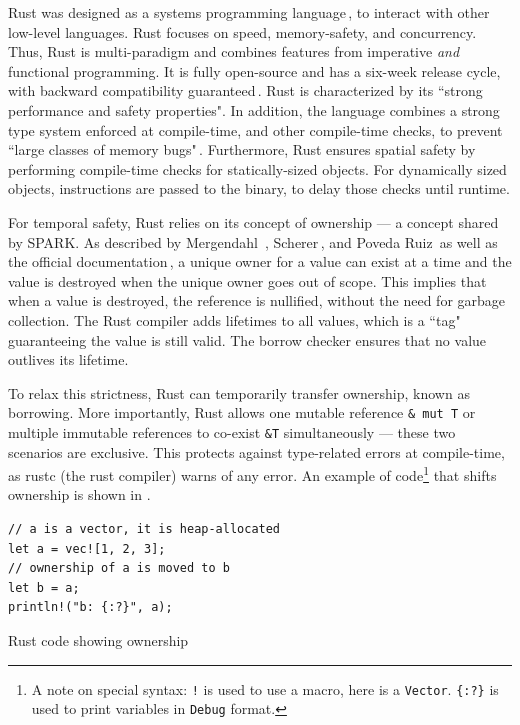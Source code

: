 \documentclass[nomenclature, english, bibtex]{kththesis}
\newcommand{\inlinecode}[1]{\texttt{#1}}
\begin{document}
Rust was designed as a systems programming language\,\cite{mergendahl_cross-language_2022}, to interact with other low-level languages. Rust focuses on speed, \gls{memory-safety}, and concurrency. Thus, Rust is multi-paradigm and combines features from imperative \textit{and} functional programming. It is fully open-source and has a six-week release cycle, with backward compatibility guaranteed\,\cite{poveda_ruiz_bounded_2019,noauthor_rust_nodate}. Rust is characterized by its ``strong performance and safety properties". In addition, the language combines a strong type system enforced at compile-time, and other compile-time checks, to prevent ``large classes of memory bugs"\,\cite{mergendahl_cross-language_2022}. Furthermore, Rust ensures spatial safety by performing compile-time checks for statically-sized objects. For dynamically sized objects, instructions are passed to the binary, to delay those checks until runtime.

For temporal safety, Rust relies on its concept of ownership --- a concept shared by SPARK. As described by Mergendahl \etal\,\cite{mergendahl_cross-language_2022}, Scherer\,\cite{scherer_engineering_2021}, and Poveda Ruiz\,\cite{poveda_ruiz_bounded_2019} as well as the official documentation\,\cite{noauthor_rust_nodate}, a unique owner for a value can exist at a time and the value is destroyed when the unique owner goes out of scope.  This implies that when a value is destroyed, the reference is nullified, without the need for garbage collection. The Rust compiler adds lifetimes to all values, which is a ``tag" guaranteeing the value is still valid. The borrow checker ensures that no value outlives its lifetime.
 
To relax this strictness, Rust can temporarily transfer ownership, known as borrowing. More importantly, Rust allows one mutable reference \inlinecode{\& mut T} or multiple immutable references to co-exist \inlinecode{\&T} simultaneously --- these two scenarios are exclusive. This  protects against type-related errors at compile-time, as rustc (the rust compiler) warns of any error. An example of code\footnote{A note on special syntax: \texttt{!} is used to use a macro, here is a \texttt{Vector}. \texttt{\{:?\}} is used to print variables in \texttt{Debug} format.} that shifts ownership is shown in .

\begin{listing}[!ht]
\begin{verbatim}
// a is a vector, it is heap-allocated
let a = vec![1, 2, 3]; 
// ownership of a is moved to b
let b = a;             
println!("b: {:?}", a);
\end{verbatim}
\caption[Rust code showing ownership]{Rust code showing ownership}
\label{lst:rust_ownership}
\end{listing}
\end{document}
